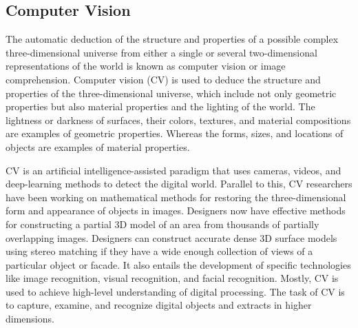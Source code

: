\subsection{Computer Vision}
The automatic deduction of the structure and properties of a possible complex three-dimensional universe from either a single or several two-dimensional representations of the world is known as computer vision or image comprehension\cite{nalwa_what_1993}. 
Computer vision (CV) is used to deduce the structure and properties of the three-dimensional universe, which include not only geometric properties but also material properties and the lighting of the world. 
The lightness or darkness of surfaces, their colors, textures, and material compositions are examples of geometric properties. Whereas the forms, sizes, and locations of objects are examples of material properties\cite{szeliski_computer_2010}. %

CV is an artificial intelligence-assisted paradigm that uses cameras, videos, and deep-learning methods to detect the digital world. Parallel to this, CV researchers have been working on mathematical methods for restoring the three-dimensional form and appearance of objects in images\cite{guo_lossy_2018}. 
Designers now have effective methods for constructing a partial 3D model of an area from thousands of partially overlapping images. Designers can construct accurate dense 3D surface models using stereo matching if they have a wide enough collection of views of a particular object or facade\cite{liu_detection_2020}. 
It also entails the development of specific technologies like image recognition, visual recognition, and facial recognition. Mostly, CV is used to achieve high-level understanding of digital processing. The task of CV is to capture, examine, and recognize digital objects and extracts in higher dimensions\cite{manogaran_wearable_2019}.


